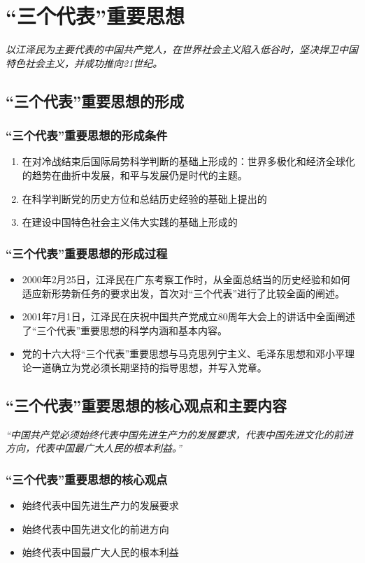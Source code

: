 \chapter{“三个代表”重要思想}
\emph{以江泽民为主要代表的中国共产党人，在世界社会主义陷入低谷时，坚决捍卫中国特色社会主义，并成功推向21世纪。}


\section{“三个代表”重要思想的形成}
    \subsection{“三个代表”重要思想的形成条件}
        \begin{enumerate}
            \item 在对冷战结束后国际局势科学判断的基础上形成的：世界多极化和经济全球化的趋势在曲折中发展，和平与发展仍是时代的主题。
            \item 在科学判断党的历史方位和总结历史经验的基础上提出的
            \item 在建设中国特色社会主义伟大实践的基础上形成的
        \end{enumerate}

    \subsection{“三个代表”重要思想的形成过程}
        \begin{itemize}
            \item 2000年2月25日，江泽民在广东考察工作时，从全面总结当的历史经验和如何适应新形势新任务的要求出发，首次对“三个代表”进行了比较全面的阐述。
            \item 2001年7月1日，江泽民在庆祝中国共产党成立80周年大会上的讲话中全面阐述了“三个代表”重要思想的科学内涵和基本内容。
            \item 党的十六大将“三个代表”重要思想与马克思列宁主义、毛泽东思想和邓小平理论一道确立为党必须长期坚持的指导思想，并写入党章。
        \end{itemize}


\section{“三个代表”重要思想的核心观点和主要内容}
    \emph{“中国共产党必须始终代表中国先进生产力的发展要求，代表中国先进文化的前进方向，代表中国最广大人民的根本利益。”}

    \subsection{“三个代表”重要思想的核心观点}
        \begin{itemize}
            \item 始终代表中国先进生产力的发展要求
            \item 始终代表中国先进文化的前进方向
            \item 始终代表中国最广大人民的根本利益
        \end{itemize}

